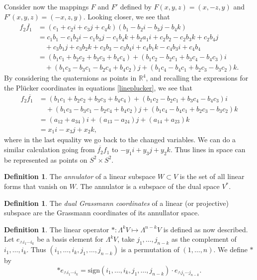 \documentclass[a4paper,12pt]{book}
\theoremstyle{plain}
\theoremstyle{definition}
\newtheorem{defi}[equation]{Definition}
\begin{document}
Consider now the mappings \( F \) and \( F' \) defined by \( F(x, y, z) = (x, -z, y) \)
and \( F'(x, y, z) = (-x, z, y) \).
Looking closer, we see that
\begin{align*}
	f_2 \overline{f_1} &= (c_1 + c_2 i + c_3 j + c_4 k)(b_1 - b_2 i - b_3 j - b_4 k) \\
	&= c_1 b_1 - c_1 b_2 i - c_1 b_3 j -
	c_1 b_4 k + b_2 a_1 i + c_2 b_2 - c_2 b_3 k + c_2 b_4 j \\
	& \quad + c_3 b_1 j + c_3 b_2 k + c_3 b_3 - c_3 b_4 i + c_4 b_1 k - c_4 b_3 i + c_4 b_4 \\
	&= (b_1 c_1 + b_2 c_2 + b_3 c_3 + b_4 c_4) + (b_1 c_2 - b_2 c_1 + b_3 c_4 - b_4 c_3) i \\
	& \quad + (b_1 c_3 - b_3 c_1 - b_2 c_4 + b_4 c_2) j
	+ (b_1 c_4 - b_4 c_1 + b_2 c_3 - b_3 c_2) k.
\end{align*}
By considering the quaternions as points in \( \mathbb{R}^4 \), and recalling the expressions
for the Pl\"ucker coordinates in equations \eqref{lineplucker}, we see that
\begin{align*}
	f_2 \overline{f_1} &= (b_1 c_1 + b_2 c_2 + b_3 c_3 + b_4 c_4) +
	(b_1 c_2 - b_2 c_1 + b_3 c_4 - b_4 c_3) i \\
	& \quad + (b_1 c_3 - b_3 c_1 - b_2 c_4 + b_4 c_2) j
	+ (b_1 c_4 - b_4 c_1 + b_2 c_3 - b_3 c_2) k \\
	&= (a_{12} + a_{34}) i + (a_{13} - a_{24}) j + (a_{14} + a_{23}) k \\
	&= x_1 i - x_3 j + x_2 k,
\end{align*}
where in the last equality we go back to the changed variables. We can do a similar
calculation going from \( \overline{f_2} f_1 \) to \(-y_1 i + y_3 j + y_2 k \).
Thus lines in space can be represented as points on \( S^2 \times S^2 \).




\begin{defi}
	The \emph{annulator} of a linear subspace \( W \subset V \) is the set of all linear forms
	that vanish on \( W \). The annulator is a subspace of the dual space \( V^* \).
\end{defi}

\begin{defi}
	The \emph{dual Grassmann coordinates} of a linear (or projective) subspace are the Grassmann
	coordinates of its annullator space.
\end{defi}

\begin{defi}
	The linear operator \( * : \Lambda^k V \mapsto \Lambda^{n-k} V \) is defined as now described.
	Let \( e_{\wedge i_1 \cdots i_k} \) be a basis element for \( \Lambda^k V \), take
	\( j_1, \ldots, j_{n-k} \) as the complement of \( i_1, \ldots, i_k \). Thus
	\( (i_1, \ldots, i_k, j_1, \ldots, j_{n-k}) \) is a permutation of \( (1, \ldots, n) \).
	We define \( * \) by
	\[
		* e_{\wedge i_1 \cdots i_k} = \text{sign}(i_1, \ldots, i_k, j_1, \ldots, j_{n-k}) \cdot
		e_{\wedge j_1 \cdots j_{n-k}}.
	\]
\end{defi}
\end{document}
